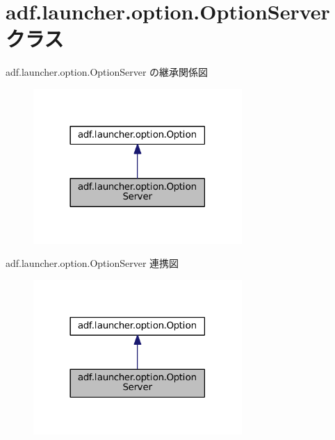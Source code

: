 \hypertarget{classadf_1_1launcher_1_1option_1_1OptionServer}{}\section{adf.\+launcher.\+option.\+Option\+Server クラス}
\label{classadf_1_1launcher_1_1option_1_1OptionServer}


adf.\+launcher.\+option.\+Option\+Server の継承関係図
\nopagebreak
\begin{figure}[H]
\begin{center}
\leavevmode
\includegraphics[width=225pt]{classadf_1_1launcher_1_1option_1_1OptionServer__inherit__graph}
\end{center}
\end{figure}


adf.\+launcher.\+option.\+Option\+Server 連携図
\nopagebreak
\begin{figure}[H]
\begin{center}
\leavevmode
\includegraphics[width=225pt]{classadf_1_1launcher_1_1option_1_1OptionServer__coll__graph}
\end{center}
\end{figure}
